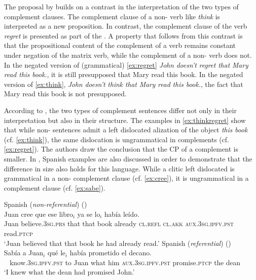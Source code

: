The proposal by \citet{Cuba2013}  builds on a contrast in the interpretation of the two types of complement clauses.
The complement clause of a non- verb like \emph{think} is interpreted as a new proposition. In contrast,  the complement clause of the  verb \emph{regret} is presented as part of the . A property that follows from this contrast is that  the propositional content of the complement of a  verb remains constant under negation of the matrix verb, while the complement of a  non- verb does not. In the negated version of (grammatical) \eqref{ex:regret} \emph{John doesn't regret that Mary read this book.}, it is still presupposed that Mary read this book. In the negated version of \eqref{ex:think}, \emph{John doesn't think that Mary read this book.}, the fact that Mary read this book is not presupposed. 

According to \citet{Cuba2013}, the two types of complement sentences  differ not only in their interpretation but also in their structure. The examples in \eqref{ex:thinkregret} show that while non- sentences admit a left dislocated alization of the object \emph{this book} (cf. \ref{ex:think}), the same dislocation	  is ungrammatical in  complements (cf. \ref{ex:regret}). The authors draw the conclusion that the CP of a  complement  is smaller. 
In \citet{Cuba2013},  Spanish examples are also discussed in order to demonstrate that the difference in size also holds for this language. While a clitic left dislocated  is grammatical in a non- complement clause (cf. \ref{ex:cree}), it is ungrammatical in a  complement clause (cf. \ref{ex:sabe}). 
 
\ea
\ea
		Spanish (\textit{non-referential}) (\citealt[9--10: ex 11c]{Cuba2013})\label{ex:cree}\\
\gll  Juan cree que ese libro$_i$ ya se lo$_i$ había leído. \\
 		Juan believe.\textsc{3sg.prs} that that book already \textsc{cl.refl} \textsc{cl.akk} \textsc{aux.3sg.ipfv.pst} read.\textsc{ptcp}\\
 	\glt `Juan believed that that book he had already read.' 
\ex
 				Spanish  (\textit{referential}) (\citealt[10: ex 12a]{Cuba2013})\label{ex:sabe}\\
 		\gll * Sabía a Juan$_i$ qué le$_i$ había prometido el decano. \\
 		~ know.\textsc{3sg.ipfv.pst} to Juan what him \textsc{aux.3sg.ipfv.pst} promise.\textsc{ptcp} the dean\\
 \glt 	`I knew what the dean had promised John.' 
 	\z
 \z
 
